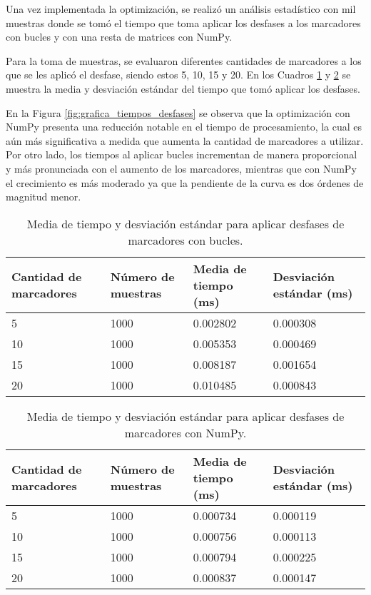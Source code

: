 Una vez implementada la optimización, se realizó un análisis estadístico con mil muestras donde se tomó el tiempo que toma aplicar los desfases a los marcadores con bucles y con una resta de matrices con NumPy.

Para la toma de muestras, se evaluaron diferentes cantidades de marcadores a los que se les aplicó el desfase, siendo estos 5, 10, 15 y 20. En los Cuadros \ref{cuadro:tiempos_desfases_for} y \ref{cuadro:tiempos_desfases_numpy} se muestra la media y desviación estándar del tiempo que tomó aplicar los desfases.

En la Figura \ref{fig:grafica_tiempos_desfases} se observa que la optimización con NumPy presenta una reducción notable en el tiempo de procesamiento, la cual es aún más significativa a medida que aumenta la cantidad de marcadores a utilizar. Por otro lado, los tiempos al aplicar bucles incrementan de manera proporcional y más pronunciada con el aumento de los marcadores, mientras que con NumPy el crecimiento es más moderado ya que la pendiente de la curva es dos órdenes de magnitud menor.

\begin{table}[H]
	\centering
	\resizebox{\textwidth}{!} {
	\begin{tabular}{|l|l|l|l|}
		\hline
		\textbf{Cantidad de marcadores} & \textbf{Número de muestras} & \textbf{Media de tiempo (ms)} & \textbf{Desviación estándar (ms)} \\ \hline
		5 & 1000 & 0.002802 & 0.000308 \\ \hline
		10 & 1000 & 0.005353 & 0.000469 \\ \hline
		15 & 1000 & 0.008187 & 0.001654 \\ \hline
		20 & 1000 & 0.010485 & 0.000843 \\ \hline
	\end{tabular}}
	\caption{Media de tiempo y desviación estándar para aplicar desfases de marcadores con bucles.}
	\label{cuadro:tiempos_desfases_for}
\end{table}

\begin{table}[H]
	\centering
	\resizebox{\textwidth}{!} {
	\begin{tabular}{|l|l|l|l|}
		\hline
		\textbf{Cantidad de marcadores} & \textbf{Número de muestras} & \textbf{Media de tiempo (ms)} & \textbf{Desviación estándar (ms)} \\ \hline
		5 & 1000 & 0.000734 & 0.000119 \\ \hline
		10 & 1000 & 0.000756 & 0.000113 \\ \hline
		15 & 1000 & 0.000794 & 0.000225 \\ \hline
		20 & 1000 & 0.000837 & 0.000147 \\ \hline
	\end{tabular}}
	\caption{Media de tiempo y desviación estándar para aplicar desfases de marcadores con NumPy.}
	\label{cuadro:tiempos_desfases_numpy}
\end{table}

